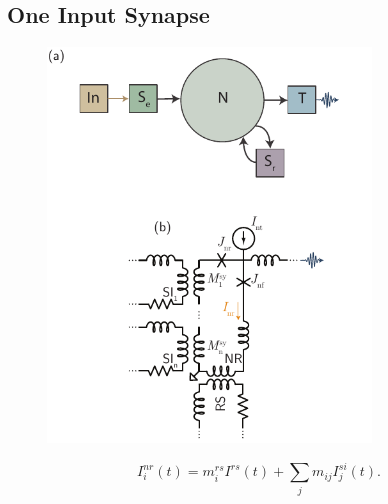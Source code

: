 \documentclass[twocolumn]{article}
\begin{document}

\subsection{\label{sec:single_synapse}One Input Synapse}

\begin{figure}[htb]
\includegraphics[width=8.6cm]{figures/_06__point_neuron__schematic__circuit.pdf}
\end{figure}

\begin{equation}
\label{eq:I_nr__with_refraction}
I_i^{nr}(t) = m_i^{rs}I^{rs}(t)+\sum_j m_{ij} I_j^{si}(t).
\end{equation}
\end{document}
